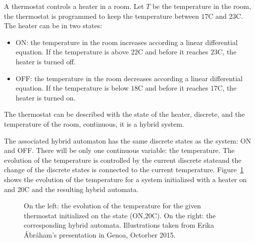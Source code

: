 \begin{example} A thermostat controls a heater in a room. Let $T$ be the temperature in the room, the thermostat is programmed to keep the temperature between $17$\textdegree C and $23$\textdegree C.
The heater can be in two states:
\begin{itemize}
\item ON: the temperature in the room increases according a linear differential equation. If the temperature is above $22$\textdegree C and before it reaches $23$\textdegree C, the heater is turned off.
\item OFF: the temperature in the room decreases according a linear differential equation. If the temperature is below $18$\textdegree C and before it reaches $17$\textdegree C, the heater is turned on.
\end{itemize}
The thermostat can be described with the state of the heater, discrete, and the temperature of the room, continuous, it is a hybrid system.


The associated hybrid automaton has the same discrete states as the system: ON and OFF. There will be only one continuous variable: the temperature. The evolution of the temperature is controlled by the current discrete stateand the change of the discrete states is connected to the current temperature. Figure~\ref{fig_thermostat} shows the evolution of the temperature for a system initialized with a heater on and $20$\textdegree C and the resulting hybrid automata.

\begin{figure}

\caption{On the left: the evolution of the temperature for the given thermostat initialized on the state (ON,$20$\textdegree C). On the right: the corresponding hybrid automata. Illustrations taken from Erika \'Abr\'aham's presentation in Genoa, Octorber 2015.}
\label{fig_thermostat}
\end{figure}

\label{exp_thermostat}
\end{example}


